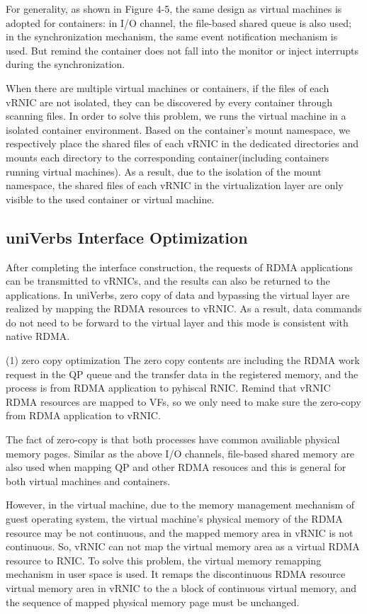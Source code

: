 \documentclass[sigplan,screen]{acmart}
\begin{document}
 For generality, as shown in Figure 4-5, the same design as virtual machines is adopted for containers: in I/O channel, the file-based shared queue is also used; in the synchronization mechanism, the same event notification mechanism is used. But remind the container does not fall into the monitor or inject interrupts during the synchronization.

When there are multiple virtual machines or containers, if the files of each vRNIC are not isolated, they can be discovered by every container through scanning files. In order to solve this problem, we runs the virtual machine in a isolated container environment. Based on the container's mount namespace, we respectively place the shared files of each vRNIC in the dedicated directories and mounts each directory to the corresponding container(including containers running virtual machines). As a result, due to the isolation of the mount namespace, the shared files of each vRNIC in the virtualization layer are only visible to the used container or virtual machine.  

\subsection{uniVerbs Interface Optimization}
After completing the interface construction, the requests of RDMA applications can be transmitted to vRNICs, and the results can also be returned to the applications. In uniVerbs, zero copy of data and bypassing the virtual layer are realized by mapping the RDMA resources to vRNIC. As a result, data commands do not need to be forward to the virtual layer and this mode is consistent with native RDMA.

(1) zero copy optimization
The zero copy contents are including the RDMA work request in the QP queue and the transfer data in the registered memory, and the process is from RDMA application to pyhiscal RNIC. Remind that vRNIC RDMA resources are mapped to VFs, so we only need to make sure the zero-copy from RDMA application to vRNIC.

The fact of zero-copy is that both processes have common availiable physical memory pages. Similar as the above I/O channels, file-based shared memory are also used when mapping QP and other RDMA resouces and this is general for both virtual machines and containers.

However, in the virtual machine, due to the memory management mechanism of guest operating system, the virtual machine's physical memory of the RDMA resource may be not continuous, and the mapped memory area in vRNIC is not continuous. So, vRNIC can not map the virtual memory area as a virtual RDMA resource to RNIC. To solve this problem, the virtual memory remapping mechanism in user space is used. It remaps the discontinuous RDMA resource virtual memory area in vRNIC to the a block of continuous virtual memory, and the  sequence of mapped physical memory page must be unchanged.
\end{document}
